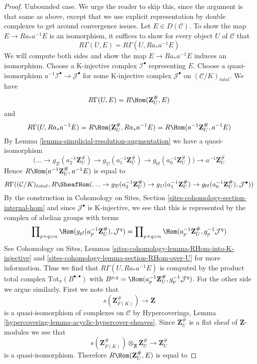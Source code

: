 \begin{proof}
\medskip\noindent
Unbounded case. We urge the reader to skip this, since the argument
is that same as above, except that we use explicit representation
by double complexes to get around convergence issues.
Let $E \in D(\mathcal{C})$.
To show the map $E \to Ra_*a^{-1}E$ is an isomorphism,
it suffices to show for every object $U$ of $\mathcal{C}$ that
$$
R\Gamma(U, E) = R\Gamma(U, Ra_*a^{-1}E)
$$
We will compute both sides and show the map $E \to Ra_*a^{-1}E$
induces an isomorphism. Choose a K-injective
complex $\mathcal{I}^\bullet$ representing $E$. Choose a quasi-isomorphism
$a^{-1}\mathcal{I}^\bullet \to \mathcal{J}^\bullet$
for some K-injective complex $\mathcal{J}^\bullet$ on
$(\mathcal{C}/K)_{total}$. We have
$$
R\Gamma(U, E) = R\Hom(\mathbf{Z}_U^\#, E)
$$
and
$$
R\Gamma(U, Ra_*a^{-1}E) = R\Hom(\mathbf{Z}_U^\#, Ra_*a^{-1}E) =
R\Hom(a^{-1}\mathbf{Z}_U^\#, a^{-1}E)
$$
By Lemma \ref{lemma-simplicial-resolution-augmentation}
we have a quasi-isomorphism
$$
\Big(\ldots \to
g_{2!}(a_2^{-1}\mathbf{Z}_U^\#) \to
g_{1!}(a_1^{-1}\mathbf{Z}_U^\#) \to
g_{0!}(a_0^{-1}\mathbf{Z}_U^\#)\Big)
\longrightarrow
a^{-1}\mathbf{Z}_U^\#
$$
Hence $R\Hom(a^{-1}\mathbf{Z}_U^\#, a^{-1}E)$ is equal to
$$
R\Gamma((\mathcal{C}/K)_{total},
R\SheafHom(
\ldots \to
g_{2!}(a_2^{-1}\mathbf{Z}_U^\#) \to
g_{1!}(a_1^{-1}\mathbf{Z}_U^\#) \to
g_{0!}(a_0^{-1}\mathbf{Z}_U^\#),
\mathcal{J}^\bullet))
$$
By the construction in Cohomology on Sites, Section
\ref{sites-cohomology-section-internal-hom}
and since $\mathcal{J}^\bullet$ is K-injective, we see that
this is represented by the complex of abelian groups with terms
$$
\prod\nolimits_{p + q = n}
\Hom(g_{p!}(a_p^{-1}\mathbf{Z}_U^\#), \mathcal{J}^q) =
\prod\nolimits_{p + q = n}
\Hom(a_p^{-1}\mathbf{Z}_U^\#, g_p^{-1}\mathcal{J}^q)
$$
See Cohomology on Sites, Lemmas
\ref{sites-cohomology-lemma-RHom-into-K-injective} and
\ref{sites-cohomology-lemma-section-RHom-over-U} for more information.
Thus we find that $R\Gamma(U, Ra_*a^{-1}E)$ is computed by
the product total complex $\text{Tot}_\pi(B^{\bullet, \bullet})$
with $B^{p, q} = \Hom(a_p^{-1}\mathbf{Z}_U^\#, g_p^{-1}\mathcal{J}^q)$.
For the other side we argue similarly. First we note that
$$
s(\mathbf{Z}_{F(K)}^\#) \longrightarrow \mathbf{Z}
$$
is a quasi-isomorphism of complexes on $\mathcal{C}$
by Hypercoverings, Lemma \ref{hypercovering-lemma-acyclic-hypercover-sheaves}.
Since $\mathbf{Z}_U^\#$ is a flat sheaf of $\mathbf{Z}$-modules
we see that
$$
s(\mathbf{Z}_{F(K)}^\#) \otimes_\mathbf{Z} \mathbf{Z}_U^\#
\longrightarrow
\mathbf{Z}_U^\#
$$
is a quasi-isomorphism. Therefore
$R\Hom(\mathbf{Z}_U^\#, E)$ is equal to

\end{proof}
